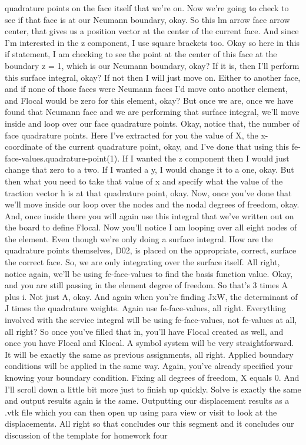 \documentclass[10pt]{article}
\begin{document}
quadrature points on the face itself that we're on. Now we're going to check to see if that face is at our Neumann boundary, okay. So this lm arrow face arrow center, that gives us a position vector at the center of the current face. And since I'm interested in the z component, I use square brackets too. Okay so here in this if statement, I am checking to see the point at the center of this face at the boundary z = 1, which is our Neumann boundary, okay? If it is, then I'll perform this surface integral, okay? If not then I will just move on. Either to another face, and if none of those faces were Neumann faces I'd move onto another element, and Flocal would be zero for this element, okay? But once we are, once we have found that Neumann face and we are performing that surface integral, we'll move inside and loop over our face quadrature points. Okay, notice that, the number of face quadrature points. Here I've extracted for you the value of X, the x-coordinate of the current quadrature point, okay, and I've done that using this fe-face-values.quadrature-point(1). If I wanted the z component then I would just change that zero to a two. If I wanted a y, I would change it to a one, okay. But then what you need to take that value of x and specify what the value of the traction vector h is at that quadrature point, okay. Now, once you've done that we'll move inside our loop over the nodes and the nodal degrees of freedom, okay. And, once inside there you will again use this integral that we've written out on the board to define Flocal. Now you'll notice I am looping over all eight nodes of the element. Even though we're only doing a surface integral. How are the quadrature points themselves, D02, is placed on the appropriate, correct, surface the correct face. So, we are only integrating over the surface itself. All right, notice again, we'll be using fe-face-values to find the basis function value. Okay, and you are still passing in the element degree of freedom. So that's 3 times A plus i. Not just A, okay. And again when you're finding JxW, the determinant of J times the quadrature weights. Again use fe-face-values, all right. Everything involved with the service integral will be using fe-face-values, not fe-values at all, all right? So once you've filled that in, you'll have Flocal created as well, and once you have Flocal and Klocal. A symbol system will be very straightforward. It will be exactly the same as previous assignments, all right. Applied boundary conditions will be applied in the same way. Again, you've already specified your knowing your boundary condition. Fixing all degrees of freedom, X equals 0. And I'll scroll down a little bit more just to finish up quickly. Solve is exactly the same and output results again is the same. Outputting our displacement results as a .vtk file which you can then open up using para view or visit to look at the displacements. All right so that concludes our this segment and it concludes our discussion of the template for homework four
\end{document}
